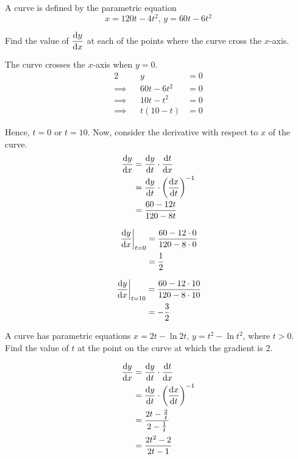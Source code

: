 \documentclass{echw}
\begin{document}

    \problem{}
        A curve is defined by the parametric equation
        \[
            x = 120t - 4t^2, \, y = 60t - 6t^2
        \]

        Find the value of $\dfrac{\mathrm{d} y}{\mathrm{d} x}$ at each of the points where the curve cross the $x$-axis.

    \solution
        The curve crosses the $x$-axis when $y=0$.
        \begin{alignat*}{2}
            &&y &= 0\\
            \implies&&60t-6t^2 &= 0\\
            \implies&&10t-t^2 &= 0\\
            \implies&&t(10 - t) &= 0
        \end{alignat*}

        Hence, $t = 0$ or $t = 10$. Now, consider the derivative with respect to $x$ of the curve.
        \begin{align*}
            \dfrac{\mathrm{d} y}{\mathrm{d} x} &= \dfrac{\mathrm{d} y}{\mathrm{d} t} \cdot \dfrac{\mathrm{d} t}{\mathrm{d} x}\\
            &= \dfrac{\mathrm{d} y}{\mathrm{d} t} \cdot \left(\dfrac{\mathrm{d} x}{\mathrm{d} t}\right)^{-1}\\
            &= \dfrac{60 - 12t}{120 - 8t}
        \end{align*}

        \begin{align*}
            \left.\dfrac{\mathrm{d} y}{\mathrm{d} x}\right|_{t = 0} &= \dfrac{60 - 12\cdot 0}{120 - 8\cdot0}\\
            &= \dfrac12
        \end{align*}

        \begin{align*}
            \left.\dfrac{\mathrm{d} y}{\mathrm{d} x}\right|_{t = 10} &= \dfrac{60 - 12\cdot 10}{120 - 8\cdot10}\\
            &= -\dfrac32
        \end{align*}


    \problem{}
        A curve has parametric equations $x = 2t-\ln{2t}, \, y = t^2 - \ln t^2$, where $t > 0$. Find the value of $t$ at the point on the curve at which the gradient is 2.

    \solution
        \begin{align*}
            \dfrac{\mathrm{d} y}{\mathrm{d} x} &= \dfrac{\mathrm{d} y}{\mathrm{d} t} \cdot \dfrac{\mathrm{d} t}{\mathrm{d} x}\\
            &= \dfrac{\mathrm{d} y}{\mathrm{d} t} \cdot \left(\dfrac{\mathrm{d} x}{\mathrm{d} t}\right)^{-1}\\
            &= \dfrac{2t - \tfrac2t}{2 - \tfrac1t}\\
            &= \dfrac{2t^2 - 2}{2t - 1}
        \end{align*}
\end{document}
